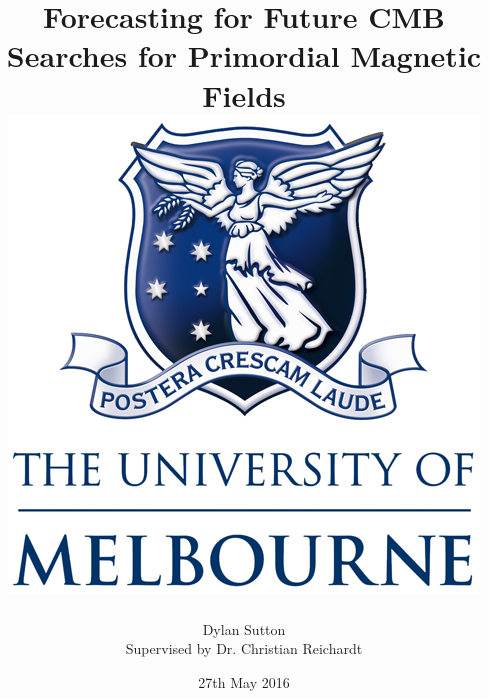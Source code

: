 \documentclass[12pt]{article}
\title{
	{Forecasting for Future CMB Searches for Primordial Magnetic Fields}\\
	{\includegraphics{UOM.png}}
}
\author{
	{Dylan Sutton}\\
	{Supervised by Dr. Christian Reichardt}
}
\date{27th May 2016}
\begin{document}
\maketitle
\makeindex
\pagebreak

\tableofcontents







%
%
\end{document}
